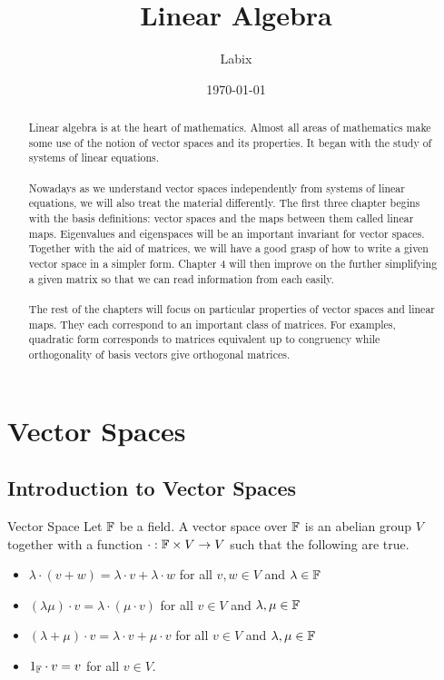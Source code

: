 \documentclass[a4paper]{article}
\title{Linear Algebra}
\author{Labix}
\date{\today}
\begin{document}
\maketitle
\begin{abstract}
Linear algebra is at the heart of mathematics. Almost all areas of mathematics make some use of the notion of vector spaces and its properties. It began with the study of systems of linear equations. \\~\\

Nowadays as we understand vector spaces independently from systems of linear equations, we will also treat the material differently. The first three chapter begins with the basis definitions: vector spaces and the maps between them called linear maps. Eigenvalues and eigenspaces will be an important invariant for vector spaces. Together with the aid of matrices, we will have a good grasp of how to write a given vector space in a simpler form. Chapter 4 will then improve on the further simplifying a given matrix so that we can read information from each easily. \\~\\

The rest of the chapters will focus on particular properties of vector spaces and linear maps. They each correspond to an important class of matrices. For examples, quadratic form corresponds to matrices equivalent up to congruency while orthogonality of basis vectors give orthogonal matrices. 
\end{abstract}
\pagebreak
\tableofcontents
\pagebreak

\section{Vector Spaces}
\subsection{Introduction to Vector Spaces}
\begin{defn}{Vector Space}{} Let $\mathbb{F}$ be a field. A vector space over $\mathbb{F}$ is an abelian group $V$ together with a function $\cdot:\mathbb{F}\times V\to V$ such that the following are true. 
\begin{itemize}
\item $\lambda\cdot(v+w)=\lambda\cdot v+\lambda\cdot w$ for all $v,w\in V$ and $\lambda\in\mathbb{F}$
\item $(\lambda\mu)\cdot v=\lambda\cdot(\mu\cdot v)$ for all $v\in V$ and $\lambda,\mu\in\mathbb{F}$
\item $(\lambda+\mu)\cdot v=\lambda\cdot v+\mu\cdot v$ for all $v\in V$ and $\lambda,\mu\in\mathbb{F}$
\item $1_{\mathbb{F}}\cdot v=v$ for all $v\in V$. 
\end{itemize}
\end{defn}
\end{document}
